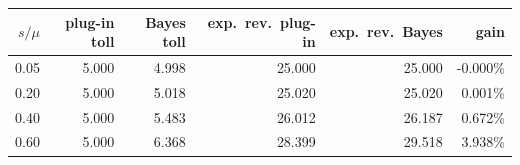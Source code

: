 \begin{tabular}{rrrrrr}
\toprule
$s/\mu$ & plug-in toll & Bayes toll & exp.\ rev.\ plug-in & exp.\ rev.\ Bayes & gain \\
\midrule
0.05 & 5.000 & 4.998 & 25.000 & 25.000 & -0.000\% \\
0.20 & 5.000 & 5.018 & 25.020 & 25.020 & 0.001\% \\
0.40 & 5.000 & 5.483 & 26.012 & 26.187 & 0.672\% \\
0.60 & 5.000 & 6.368 & 28.399 & 29.518 & 3.938\% \\
\bottomrule
\end{tabular}
